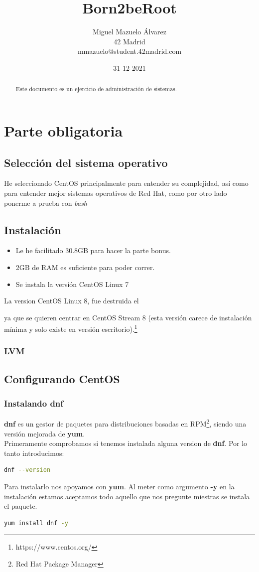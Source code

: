 \documentclass[a4paper]{article}
\title{Born2beRoot}
\author{Miguel Mazuelo Álvarez\\
  \small 42 Madrid\\
  \small mmazuelo@student.42madrid.com\\
  \date{}
}
\begin{document}
\maketitle

\begin{abstract}
Este documento es un ejercicio de administración de sistemas.
\end{abstract}

\section{Parte obligatoria}
\subsection{Selecci\'on del sistema operativo}
He seleccionado CentOS principalmente para entender su complejidad, así como para entender mejor sistemas operativos de Red Hat, como por otro lado ponerme a prueba con \textit{bash}

\subsection{Instalaci\'on}
\begin{itemize}
\item Le he facilitado 30.8GB para hacer la parte bonus.
\item 2GB de RAM es suficiente para poder correr.
\item Se instala la versión CentOS Linux 7
\end{itemize}
La version CentOS Linux 8, fue destruida el \date{31-12-2021} ya que se quieren centrar en CentOS Stream 8 (esta versión carece de instalación mínima y solo existe en versión escritorio).\footnote{https://www.centos.org/}

\subsubsection{LVM}

\subsection{Configurando CentOS}
\subsubsection{Instalando dnf}
 \textbf{dnf} es un gestor de paquetes para distribuciones basadas en RPM\footnote{Red Hat Package Manager}, siendo una versión mejorada de \textbf{yum}.\\
Primeramente comprobamos si tenemos instalada alguna version de \textbf{dnf}. Por lo tanto introducimos:
\begin{lstlisting}[language=Bash]
dnf --version
\end{lstlisting}
Para instalarlo nos apoyamos con \textbf{yum}. Al meter como argumento \textbf{-y} en la instalación estamos aceptamos todo aquello que nos pregunte miestras se instala el paquete.
\begin{lstlisting}[language=Bash]
yum install dnf -y
\end{lstlisting}
\end{document}
